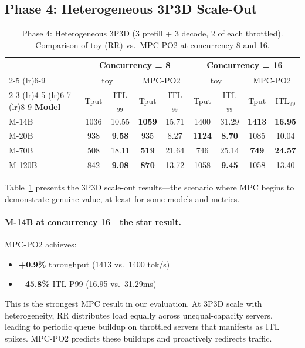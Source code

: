 \documentclass[runningheads]{llncs}
\begin{document}
\subsection{Phase 4: Heterogeneous 3P3D Scale-Out}
\label{sec:phase4}

\begin{table}[t]
\caption{Phase 4: Heterogeneous 3P3D (3 prefill + 3 decode, 2 of each throttled). Comparison of toy (RR) vs.\ MPC-PO2 at concurrency 8 and 16.}
\label{tab:phase4}
\centering
\small
\setlength{\tabcolsep}{3pt}
\begin{tabular}{l cc cc cc cc}
\toprule
& \multicolumn{4}{c}{\textbf{Concurrency = 8}} & \multicolumn{4}{c}{\textbf{Concurrency = 16}} \\
\cmidrule(lr){2-5} \cmidrule(lr){6-9}
& \multicolumn{2}{c}{toy} & \multicolumn{2}{c}{MPC-PO2} & \multicolumn{2}{c}{toy} & \multicolumn{2}{c}{MPC-PO2} \\
\cmidrule(lr){2-3} \cmidrule(lr){4-5} \cmidrule(lr){6-7} \cmidrule(lr){8-9}
\textbf{Model} & Tput & ITL$_{99}$ & Tput & ITL$_{99}$ & Tput & ITL$_{99}$ & Tput & ITL$_{99}$ \\
\midrule
M-14B  & 1036 & 10.55 & \textbf{1059} & 15.71 & 1400 & 31.29 & \textbf{1413} & \textbf{16.95} \\
M-20B  & 938  & \textbf{9.58}  & 935  & 8.27  & \textbf{1124} & \textbf{8.70}  & 1085 & 10.04 \\
M-70B  & 508  & 18.11 & \textbf{519}  & 21.64 & 746  & 25.14 & \textbf{749}  & \textbf{24.57} \\
M-120B & 842  & \textbf{9.08}  & \textbf{870}  & 13.72 & 1058 & \textbf{9.45}  & 1058 & 13.40 \\
\bottomrule
\end{tabular}
\end{table}

Table~\ref{tab:phase4} presents the 3P3D scale-out results---the scenario where MPC begins to demonstrate genuine value, at least for some models and metrics.

\paragraph{M-14B at concurrency 16---the star result.} MPC-PO2 achieves:
\begin{itemize}
    \item \textbf{+0.9\%} throughput (1413 vs.\ 1400 tok/s)
    \item \textbf{$-$45.8\%} ITL P99 (16.95 vs.\ 31.29ms)
\end{itemize}
This is the strongest MPC result in our evaluation. At 3P3D scale with heterogeneity, RR distributes load equally across unequal-capacity servers, leading to periodic queue buildup on throttled servers that manifests as ITL spikes. MPC-PO2 predicts these buildups and proactively redirects traffic.
\end{document}
